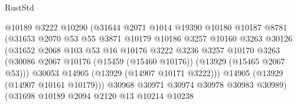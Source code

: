 \begin{lexlean}{RustStd}
\begin{coremodule}
                                    @10189
                                    @3222
                                    @10290
                                    (@31644
                                      @2071
                                      @1014
                                      @19390
                                      @10180
                                      @10187
                                      @8781
                                      (@31653
                                        @2070
                                        @53
                                        @55
                                        @3871
                                        @10179
                                        @10186
                                        @3257
                                        @10160
                                        @3263
                                        @30126
                                        (@31652
                                          @2068
                                          @103
                                          @53
                                          @16
                                          @10176
                                          @3222
                                          @3236
                                          @3257
                                          @10170
                                          @3263
                                          (@30086
                                            @2067
                                            @10176
                                            (@15459 (@15460 @10176))
                                            (@13929 (@15465 @2067 @53)))
                                          @30053
                                          @14905
                                          (@13929 (@14907 @10171 @3222)))
                                        @14905
                                        (@13929 (@14907 @10161 @10179)))
                                      @30968
                                      @30971
                                      @30974
                                      @30978
                                      @30983
                                      @30989)
                                    (@31698
                                      @10189
                                      @2094
                                      @2120
                                      @13
                                      @10214
                                      @10238

\end{coremodule}
\end{lexlean}
